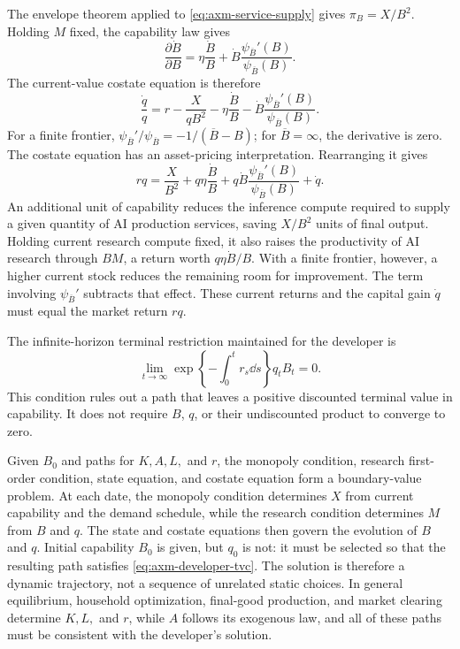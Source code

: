 The envelope theorem applied to \eqref{eq:axm-service-supply} gives
\(\pi_B=X/B^2\). Holding \(M\) fixed, the capability law gives
\[
 \frac{\partial\dot B}{\partial B}
 =\eta\frac{\dot B}{B}
 +\dot B\frac{\psi_{\overline B}'(B)}{
 \psi_{\overline B}(B)}.
\]
The current-value costate equation is therefore
\begin{equation}
 \frac{\dot q}{q}=r-\frac{X}{qB^2}-\eta\frac{\dot B}{B}
 -\dot B\frac{\psi_{\overline B}'(B)}{
 \psi_{\overline B}(B)}.
 \label{eq:axm-costate-benchmark}
\end{equation}
For a finite frontier,
\(\psi_{\overline B}'/\psi_{\overline B}=-1/(\overline B-B)\); for
\(\overline B=\infty\), the derivative is zero.
The costate equation has an asset-pricing interpretation. Rearranging it gives
\begin{equation}
 rq=\frac{X}{B^2}+q\eta\frac{\dot B}{B}
 +q\dot B\frac{\psi_{\overline B}'(B)}{
 \psi_{\overline B}(B)}+\dot q.
 \label{eq:axm-capability-return-decomposition}
\end{equation}
An additional unit of capability reduces the inference compute required to
supply a given quantity of AI production services, saving \(X/B^2\) units of
final output. Holding current research compute fixed, it also raises the
productivity of AI research through \(BM\), a return worth
\(q\eta\dot B/B\). With a finite frontier, however, a higher current stock
reduces the remaining room for improvement. The term involving
\(\psi_{\overline B}'\) subtracts that effect. These current returns and the
capital gain \(\dot q\) must equal the market return \(rq\).

The infinite-horizon terminal restriction maintained for the developer is
\begin{equation}
 \lim_{t\to\infty}
 \exp\left\{-\int_0^t r_s\dd s\right\}q_tB_t=0.
 \label{eq:axm-developer-tvc}
\end{equation}
This condition rules out a path that leaves a positive discounted terminal
value in capability. It does not require \(B\), \(q\), or their undiscounted
product to converge to zero.

Given \(B_0\) and paths for \(K,A,L,\) and \(r\), the monopoly condition,
research first-order condition, state equation, and costate equation form a
boundary-value problem. At each date, the monopoly condition determines \(X\)
from current capability and the demand schedule, while the research condition
determines \(M\) from \(B\) and \(q\). The state and costate equations then
govern the evolution of \(B\) and \(q\). Initial capability \(B_0\) is given,
but \(q_0\) is not: it must be selected so that the resulting path satisfies
\eqref{eq:axm-developer-tvc}. The solution is therefore a dynamic trajectory,
not a sequence of unrelated static choices. In general equilibrium, household
optimization, final-good production, and market clearing determine \(K,L,\)
and \(r\), while \(A\) follows its exogenous law, and all of these paths must be
consistent with the developer's solution.


